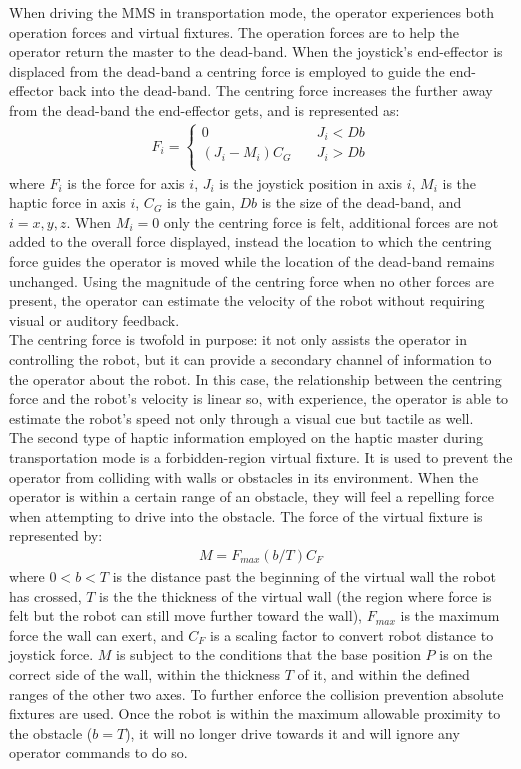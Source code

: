 \documentclass[onecolumn,10pt,final]{asme2ej}
\begin{document}
When driving the MMS in transportation mode, the operator experiences both operation forces and virtual fixtures. The operation forces are to help the operator return the master to the dead-band. When the joystick's end-effector is displaced from the dead-band a centring force is employed to guide the end-effector back into the dead-band. The centring force increases the further away from the dead-band the end-effector gets, and is represented as: 
\begin{align}
 F_i = \begin{cases} 0 & \quad J_i<Db\\ (J_i - M_i)C_G & \quad J_i>Db\\ \end{cases} 
\end{align}
where $F_i$ is the force for axis $i$, $J_i$ is the joystick position in axis $i$, $M_i$ is the haptic force in axis $i$, $C_G$ is the gain, $Db$ is the size of the dead-band, and $i=x,y,z$. When $M_i=0$ only the centring force is felt, additional forces are not added to the overall force displayed, instead the location to which the centring force guides the operator is moved while the location of the dead-band remains unchanged. Using the magnitude of the centring force when no other forces are present, the operator can estimate the velocity of the robot without requiring visual or auditory feedback.\\

The centring force is twofold in purpose: it not only assists the operator in controlling the robot, but it can provide a secondary channel of information to the operator about the robot. In this case, the relationship between the centring force and the robot's velocity is linear so, with experience, the operator is able to estimate the robot's speed not only through a visual cue but tactile as well.\\

The second type of haptic information employed on the haptic master during transportation mode is a forbidden-region virtual fixture. It is used to prevent the operator from colliding with walls or obstacles in its environment. When the operator is within a certain range of an obstacle, they will feel a repelling force when attempting to drive into the obstacle. The force of the virtual fixture is represented by: \begin{align}
M = F_{max}(b/T)C_F
\end{align}
where $0 < b < T$ is the distance past the beginning of the virtual wall the robot has crossed, $T$ is the the thickness of the virtual wall (the region where force is felt but the robot can still move further toward the wall), $F_{max}$ is the maximum force the wall can exert, and $C_F$ is a scaling factor to convert robot distance to joystick force. $M$ is subject to the conditions that the base position $P$ is on the correct side of the wall, within the thickness $T$ of it, and within the defined ranges of the other two axes. To further enforce the collision prevention absolute fixtures are used. Once the robot is within the maximum allowable proximity to the obstacle ($b = T$), it will no longer drive towards it and will ignore any operator commands to do so.\\
\end{document}

